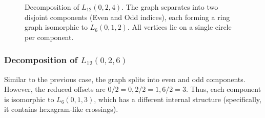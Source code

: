 \documentclass[12pt,letterpaper]{amsart}
\begin{document}
\begin{figure}[H]
    \caption{Decomposition of $L_{12}(0,2,4)$. The graph separates into two disjoint components (Even and Odd indices), each forming a ring graph isomorphic to $L_6(0,1,2)$. All vertices lie on a single circle per component.}
    \label{fig:L12_024_split}
\end{figure}




\subsubsection*{Decomposition of $L_{12}(0,2,6)$} Similar to the previous case, the graph splits into even and odd components. However, the reduced offsets are $0/2=0, 2/2=1, 6/2=3$. Thus, each component is isomorphic to $L_6(0,1,3)$, which has a different internal structure (specifically, it contains hexagram-like crossings).
\end{document}

